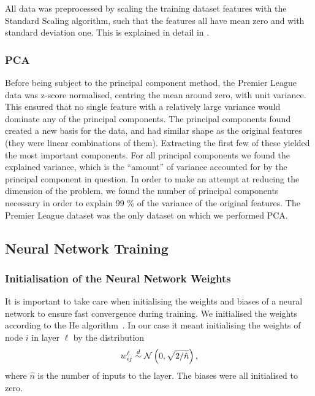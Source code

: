         All data was preprocessed by scaling the training dataset features with the Standard Scaling algorithm, such that the features all have mean zero and with standard deviation one. This is explained in detail in \cite{Project1}.

    \subsubsection{PCA}
        Before being subject to the principal component method, the Premier League data was z-score normalised, centring the mean around zero, with unit variance. This ensured that no single feature with a relatively large variance would dominate any of the principal components. The principal components found created a new basis for the data, and had similar shape as the original features (they were linear combinations of them). Extracting the first few of these yielded the most important components. For all principal components we found the explained variance, which is the ``amount'' of variance accounted for by the principal component in question. In order to make an attempt at reducing the dimension of the problem, we found the number of principal components necessary in order to explain 99 \% of the variance of the original features. The Premier League dataset was the only dataset on which we performed PCA.  


\subsection{Neural Network Training}

    \subsubsection{Initialisation of the Neural Network Weights}
        It is important to take care when initialising the weights and biases of a neural network to ensure fast convergence during training. We initialised the weights according to the He algorithm~\citep{He}. In our case it meant initialising the weights of node $i$ in layer $\ell$ by the distribution
        \begin{align}
            w^\ell_{ij} \overset{d}{\sim} \operatorname{\mathcal{N}}\left(0,\sqrt{2/\hat{n}}\right),
        \end{align}
        where $\hat{n}$ is the number of inputs to the layer. The biases were all initialised to zero.

